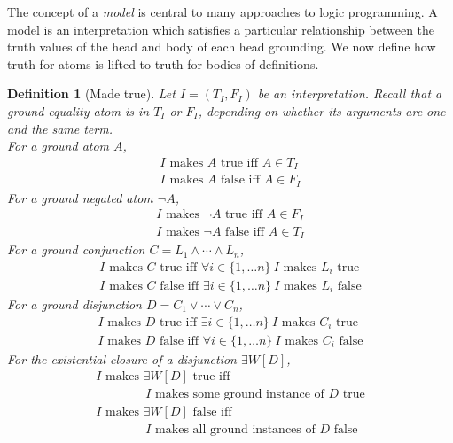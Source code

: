 \documentclass{tlp}
\newtheorem{definition}{Definition}
\begin{document}
The concept of a \emph{model} is central to many approaches to logic
programming.   A model is an interpretation which satisfies a particular
relationship between the truth values of the head and body of each head
grounding.  We now define how truth for atoms is lifted to truth for
bodies of definitions.

\begin{definition}[Made true] \rm
Let $I = (T_I, F_I)$ be an interpretation.
Recall that a ground equality atom is in $T_I$ or $F_I$, depending on
whether its arguments are one and the same term.
\\

\noindent
For a ground atom $A$,
\vspace*{-1ex}
\[
\begin{array}{l}
   \mbox{$I$ makes $A$ true iff $A \in T_I$}
\\ \mbox{$I$ makes $A$ false iff $A \in F_I$}
\end{array}
\]
For a ground negated atom $\neg A$,
\vspace*{-1ex}
\[
\begin{array}{l}
   \mbox{$I$ makes $\neg A$ true iff $A \in F_I$}
\\ \mbox{$I$ makes $\neg A$ false iff $A \in T_I$}
\end{array}
\]
For a ground conjunction $C = L_1 \land \cdots \land L_n$,
\vspace*{-1ex}
\[
\begin{array}{l}
   \mbox{$I$ makes $C$ true iff $\forall i \in \{1,\ldots n\}\ I$ makes $L_i$ true}
\\ \mbox{$I$ makes $C$ false iff $\exists i \in \{1,\ldots n\}\ I$ makes $L_i$ false}
\end{array}
\]
For a ground disjunction $D = C_1 \lor \cdots \lor C_n$,
\vspace*{-1ex}
\[
\begin{array}{l}
\mbox{$I$ makes $D$ true iff $\exists i \in \{1,\ldots n\}\ I$ makes $C_i$ true}
\\ \mbox{$I$ makes $D$ false iff $\forall i \in \{1,\ldots n\}\ I$ makes $C_i$ false}
\end{array}
\]
For the existential closure of a disjunction $\exists W [D]$,
\vspace*{-1ex}
\[
\begin{array}{l}
\mbox{$I$ makes $\exists W [D]$ true iff} \\
  \qquad\qquad \mbox{$I$ makes some ground instance of $D$ true} \\
\mbox{$I$ makes $\exists W [D]$ false iff} \\
  \qquad\qquad \mbox{$I$ makes all ground instances of $D$ false} \\
\end{array}
\]
\end{definition}
\end{document}
